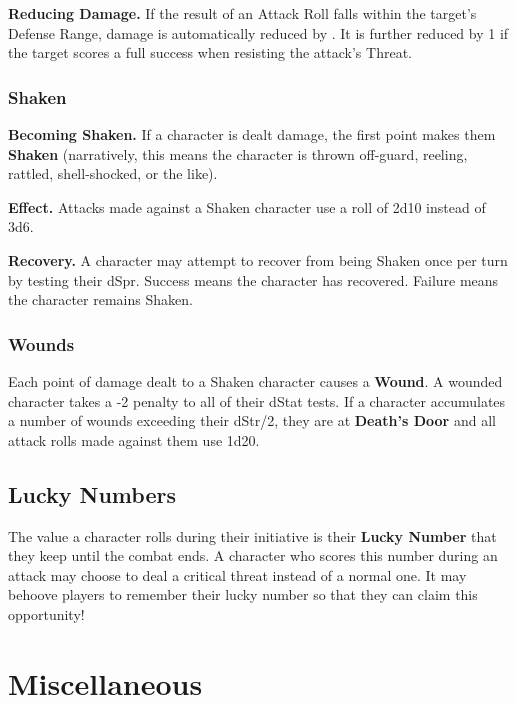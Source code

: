 \documentclass[10pt,twoside,twocolumn,openany]{book}
\begin{document}
\textbf{Reducing Damage.} If the result of an Attack Roll falls within the target's Defense Range, damage is automatically reduced by \damage. It is further reduced by 1 if the target scores a full success when resisting the attack's Threat.

\subsubsection{Shaken}
\textbf{Becoming Shaken.} If a character is dealt damage, the first point makes them \textbf{Shaken} (narratively, this means the character is thrown off-guard, reeling, rattled, shell-shocked, or the like).

\textbf{Effect.} Attacks made against a Shaken character use a roll of 2d10 instead of 3d6.

\textbf{Recovery.} A character may attempt to recover from being Shaken once per turn by testing their dSpr. Success means the character has recovered. Failure means the character remains Shaken.

\subsubsection{Wounds}
Each point of damage dealt to a Shaken character causes a \textbf{Wound}. A wounded character takes a -2 penalty to all of their dStat tests. If a character accumulates a number of wounds exceeding their dStr/2, they are at \textbf{Death's Door} and all attack rolls made against them use 1d20.

\subsection{Lucky Numbers}
The value a character rolls during their initiative is their \textbf{Lucky Number} that they keep until the combat ends. A character who scores this number during an attack may choose to deal a critical threat instead of a normal one. It may behoove players to remember their lucky number so that they can claim this opportunity!

\section{Miscellaneous}
\end{document}
